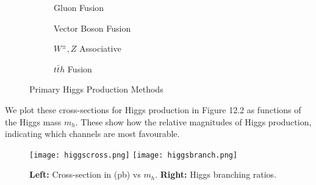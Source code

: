 \documentclass[relqm.tex]{subfiles}
\begin{document}
\begin{figure}[H]
    \centering
    \begin{subfigure}[b]{0.24\textwidth}
        \caption{Gluon Fusion}
    \end{subfigure}
    \begin{subfigure}[b]{0.24\textwidth}
        \caption{Vector Boson Fusion}
    \end{subfigure}
    \begin{subfigure}[b]{0.24\textwidth}
        \caption{$W^\pm,Z$ Associative}
    \end{subfigure}
    \begin{subfigure}[b]{0.24\textwidth}
        \caption{$t\bar{t}h$ Fusion}
    \end{subfigure}
    \caption{Primary Higgs Production Methods}
    \vspace{-10pt}
\end{figure}
We plot these cross-sections for Higgs production in Figure 12.2 as functions of the Higgs mass $m_h$. 
These show how the relative magnitudes of Higgs production, indicating which channels are most favourable. 
\begin{figure}[H]
    \centering
    \texttt{[image: higgscross.png]}
    \texttt{[image: higgsbranch.png]}
    \caption{\textbf{Left:} Cross-section in (pb) vs $m_h$. \textbf{Right:} Higgs branching ratios.}
\end{figure}
\end{document}
